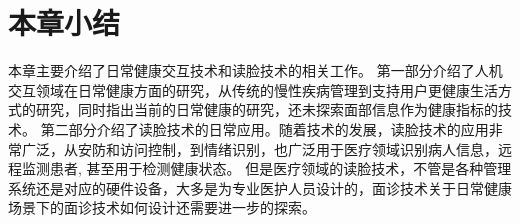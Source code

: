 



\section{本章小结}
本章主要介绍了日常健康交互技术和读脸技术的相关工作。
第一部分介绍了人机交互领域在日常健康方面的研究，从传统的慢性疾病管理到支持用户更健康生活方式的研究，同时指出当前的日常健康的研究，还未探索面部信息作为健康指标的技术。
第二部分介绍了读脸技术的日常应用。随着技术的发展，读脸技术的应用非常广泛，从安防和访问控制，到情绪识别，也广泛用于医疗领域识别病人信息，远程监测患者, 甚至用于检测健康状态。
但是医疗领域的读脸技术，不管是各种管理系统还是对应的硬件设备，大多是为专业医护人员设计的，面诊技术关于日常健康场景下的面诊技术如何设计还需要进一步的探索。